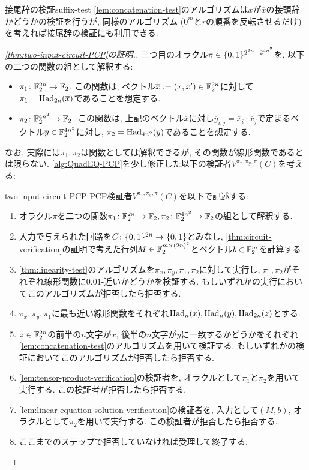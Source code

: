 \begin{remark}{接尾辞の検証}{suffix-test}
  \cref{lem:concatenation-test}のアルゴリズムは$x$が$\overline{x}$の接頭辞かどうかの検証を行うが, 同様のアルゴリズム ($0^m$と$r$の順番を反転させるだけ)を考えれば接尾辞の検証にも利用できる.
\end{remark}

\begin{proof}[\cref{thm:two-input-circuit-PCP}の証明.]
三つ目のオラクル$\pi\in\{0,1\}^{2^{2n} + 2^{4n^2}}$を, 以下の二つの関数の組として解釈する:
\begin{itemize}
  \item $\pi_1 \colon \mathbb{F}_2^{2n} \to \mathbb{F}_2$. この関数は, ベクトル$\overline{x}:=(x,x')\in\mathbb{F}_2^{2n}$に対して$\pi_1 = \mathrm{Had}_{2n}(\overline{x})$であることを想定する.
  \item $\pi_2 \colon \mathbb{F}_2^{4n^2} \to \mathbb{F}_2$. この関数は, 上記のベクトル$\overline{x}$に対し$\overline{y}_{i,j} = \overline{x}_i\cdot \overline{x}_j$で定まるベクトル$\overline{y}\in\mathbb{F}_2^{4n^2}$に対し, $\pi_2 = \mathrm{Had}_{4n^2}(\overline{y})$であることを想定する.
\end{itemize}
なお, 実際には$\pi_1,\pi_2$は関数としては解釈できるが, その関数が線形関数であるとは限らない.
\cref{alg:QuadEQ-PCP}を少し修正した以下の検証者$V^{\pi_x,\pi_{y},\pi}(C)$を考える:

\begin{algo}{}{two-input-circuit-PCP}
  PCP検証者$V^{\pi_x,\pi_{y},\pi}(C)$を以下で記述する:
  \begin{enumerate}
    \item オラクル$\pi$を二つの関数$\pi_1\colon\mathbb{F}_2^{2n}\to\mathbb{F}_2,\pi_2\colon\mathbb{F}_2^{4n^2}\to\mathbb{F}_2$の組として解釈する.
    \item 入力で与えられた回路を$C\colon\{0,1\}^{2n}\to\{0,1\}$とみなし, \cref{thm:circuit-verification}の証明で考えた行列$M\in\mathbb{F}_2^{m\times {(2n)^2}}$とベクトル$b\in\mathbb{F}_2^m$を計算する.
    \item \cref{thm:linearity-test}のアルゴリズムを$\pi_x,\pi_y,\pi_1,\pi_2$に対して実行し, $\pi_1,\pi_2$がそれぞれ線形関数に$0.01$-近いかどうかを検証する. もしいずれかの実行においてこのアルゴリズムが拒否したら拒否する.
    \item $\pi_x,\pi_y,\pi_1$に最も近い線形関数をそれぞれ$\mathrm{Had}_n(x),\mathrm{Had}_n(y),\mathrm{Had}_{2n}(z)$とする.
    \item $z\in\mathbb{F}_2^{2n}$の前半の$n$文字が$x$, 後半の$n$文字が$y$に一致するかどうかをそれぞれ\cref{lem:concatenation-test}のアルゴリズムを用いて検証する. もしいずれかの検証においてこのアルゴリズムが拒否したら拒否する.
    \item \cref{lem:tensor-product-verification}の検証者を, オラクルとして$\pi_1$と$\pi_2$を用いて実行する. この検証者が拒否したら拒否する.
    \item \cref{lem:linear-equation-solution-verification}の検証者を, 入力として$(M,b)$, オラクルとして$\pi_2$を用いて実行する. この検証者が拒否したら拒否する.
    \item ここまでのステップで拒否していなければ受理して終了する.
  \end{enumerate}
\end{algo}


\end{proof}
